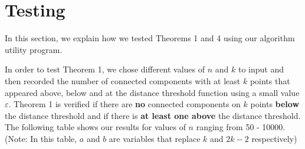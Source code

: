 \documentclass{article}
\begin{document}

\section{Testing}
In this section, we explain how we tested Theorems 1 and 4 using our algorithm utility program.

In order to test Theorem 1, we chose different values of $n$ and $k$ to input and then recorded the number of connected components with at least $k$ points that appeared above, below and at the distance threshold function using a small value $\varepsilon$. Theorem 1 is verified if there are \textbf{no} connected components on $k$ points \textbf{below} the distance threshold and if there is \textbf{at least one above} the distance threshold. The following table shows our results for values of $n$ ranging from 50 - 10000.(Note: In this table, $a$ and $b$ are variables that replace $k$ and $2k-2$ respectively)
\end{document}
